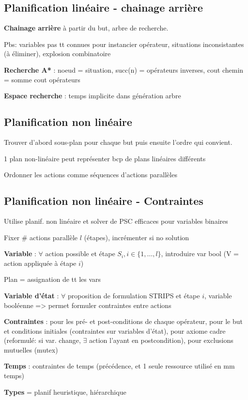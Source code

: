 \subsection*{Planification linéaire - chainage arrière}

\textbf{Chainage arrière} à partir du but, arbre de recherche. 

Pbs: variables pas tt connues pour instancier opérateur, situations inconsistantes (à éliminer), explosion combinatoire 

\textbf{Recherche A*} : noeud = situation, succ(n) = opérateurs inverses, cout chemin = somme cout opérateurs

\textbf{Espace recherche} : temps implicite dans génération arbre


\subsection*{Planification non linéaire}

Trouver d'abord sous-plan pour chaque but puis ensuite l'ordre qui convient. 

1 plan non-linéaire peut représenter bcp de plans linéaires différents

Ordonner les actions comme séquences d'actions parallèles


\subsection*{Planification non linéaire - Contraintes}

Utilise planif. non linéaire et solver de PSC efficaces pour variables binaires

Fixer \# actions parallèle $l$ (étapes), incrémenter si no solution

\textbf{Variable} : $\forall$ action possible et étape $S_i, i \in \{1,\dots,l\}$, introduire var bool (V = action appliquée à étape $i$)

Plan = assignation de tt les vars

\textbf{Variable d'état} : $\forall$ proposition de formulation STRIPS et étape $i$, variable booléenne => permet formuler contraintes entre actions

\textbf{Contraintes} : pour les pré- et post-conditions de chaque opérateur, pour le but et conditions initiales (contraintes sur variables d'état), pour axiome cadre (reformulé: si var. change, $\exists$ action l'ayant en postcondition), pour exclusions mutuelles (mutex)

\textbf{Temps} : contraintes de temps (précédence, et 1 seule ressource utilisé en mm temps)

\textbf{Types} = planif heuristique, hiérarchique 